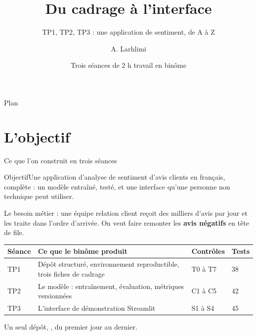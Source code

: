 \documentclass[aspectratio=169,11pt]{beamer}
\title{\textbf{Du cadrage à l'interface}}
\subtitle{TP1, TP2, TP3 : une application de sentiment, de A à Z}
\author{A. Larhlimi}
\institute{Développement et déploiement d'applications intelligentes}
\date{Trois séances de 2 h \textperiodcentered{} travail en binôme}
\newcommand{\co}[1]{\texttt{\detokenize{#1}}}
\newcommand{\objectif}[1]{\begin{block}{Objectif}#1\end{block}}
\begin{document}
{
\begin{frame}[plain]\titlepage\end{frame}}

\begin{frame}[plain]{Plan}\tableofcontents\end{frame}

\section{L'objectif}

\begin{frame}{Ce que l'on construit en trois séances}
\objectif{Une application d'analyse de sentiment d'avis clients en français, complète :
un modèle entraîné, testé, et une interface qu'une personne non technique peut utiliser.}
\vspace{4pt}
\small
Le besoin métier : une équipe relation client reçoit des milliers d'avis par jour et les traite
dans l'ordre d'arrivée. On veut faire remonter les \textbf{avis négatifs} en tête de file.
\vspace{4pt}
\begin{center}\scriptsize
\begin{tabular}{@{}p{1.2cm}p{6.6cm}p{3.0cm}p{2.4cm}@{}}
\toprule
\textbf{Séance} & \textbf{Ce que le binôme produit} & \textbf{Contrôles} & \textbf{Tests} \\
\midrule
TP1 & Dépôt structuré, environnement reproductible, trois fiches de cadrage & T0 à T7 & 38 \\
TP2 & Le modèle : entraînement, évaluation, métriques versionnées & C1 à C5 & 42 \\
TP3 & L'interface de démonstration Streamlit & S1 à S4 & 45 \\
\bottomrule
\end{tabular}
\end{center}
\vspace{2pt}
\centering\small Un seul dépôt, \co{sentiment-app}, du premier jour au dernier.
\end{frame}
\end{document}
